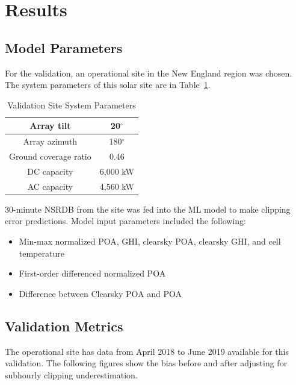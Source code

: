 \documentclass[conference]{IEEEtran}
\begin{document}
\section{Results}

\subsection{Model Parameters}

For the validation, an operational site in the New England region was chosen. The system parameters of this solar site are in Table~\ref{table1}.

\begin{table}[htbp]
\caption{Validation Site System Parameters}
\begin{center}
\begin{tabular}{ |c|c| } 
\hline
Array tilt & 20$^{\circ}$ \\
\hline
Array azimuth & 180$^{\circ}$ \\
\hline
Ground coverage ratio & 0.46 \\
\hline
DC capacity & 6,000 kW \\
\hline
AC capacity & 4,560 kW \\
\hline
\end{tabular}
\end{center}
\label{table1}
\end{table}

30-minute NSRDB from the site was fed into the ML model to make clipping error predictions. Model input parameters included the following:
\begin{itemize}
\item Min-max normalized POA, GHI, clearsky POA, clearsky GHI, and cell temperature
\item First-order differenced normalized POA
\item Difference between Clearsky POA and POA
\end{itemize}

\subsection{Validation Metrics}
The operational site has data from April 2018 to June 2019 available for this validation. The following figures show the bias before and after adjusting for subhourly clipping underestimation.
\end{document}
